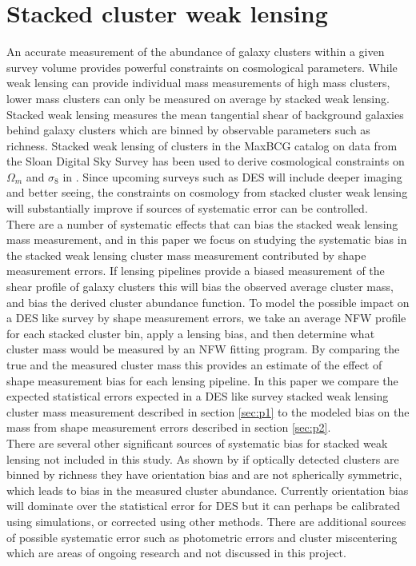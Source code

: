 \documentclass[useAMS,usenatbib]{mn2e}
\begin{document}
\section{Stacked cluster weak lensing}
An accurate measurement of the abundance of galaxy clusters within a
given survey volume provides powerful constraints on cosmological
parameters.  While weak lensing can provide individual mass
measurements of high mass clusters, lower mass clusters can only be
measured on average by stacked weak lensing. Stacked weak lensing
measures the mean tangential shear of  background galaxies behind
galaxy clusters which are binned by observable parameters such as
richness. Stacked weak lensing
of clusters in the MaxBCG catalog \citep{Koester, Eshel} on data from the 
Sloan Digital Sky Survey \citep{York} has been used to derive
cosmological constraints on $\Omega_m$ and $\sigma_8$ in
\citep{Ying, ERozo}. Since upcoming surveys such as DES  will include deeper
imaging and better seeing, the constraints on cosmology
from stacked cluster weak lensing will substantially improve if
sources of systematic error can be controlled. \\

There are a number of systematic effects that can bias the
stacked weak lensing mass measurement, and in this paper we focus
on studying the systematic bias in the stacked weak lensing cluster
mass measurement contributed by shape measurement errors. If lensing
pipelines provide a biased measurement of the shear profile of galaxy
clusters this will bias the observed average cluster mass, and bias
the derived cluster abundance function. To model the possible
impact on a DES like survey by shape measurement errors, we take an
average NFW profile for each stacked cluster bin, apply a lensing
bias, and then determine what cluster mass would be measured by
an NFW fitting program. By comparing the true and the measured cluster
mass this provides an estimate of the effect of shape measurement bias
for each lensing pipeline. In this paper we compare the expected statistical errors
expected in a DES like survey stacked weak lensing cluster mass measurement
described in section \ref{sec:p1} to the modeled bias on the mass
from shape measurement errors described in section \ref{sec:p2}. \\
There are several other significant sources of systematic bias for
stacked weak lensing not included in this study. As shown by
\citep{Joerg} if optically detected clusters are binned by richness
they have orientation bias and are not spherically symmetric, which
leads to bias in the measured cluster abundance. Currently
orientation bias will dominate over the statistical error for DES but
it can perhaps be calibrated using simulations, or corrected using
other methods. There are additional sources of possible systematic
error such as photometric errors and cluster miscentering which are 
areas of ongoing research and not discussed in this project.
\end{document}
